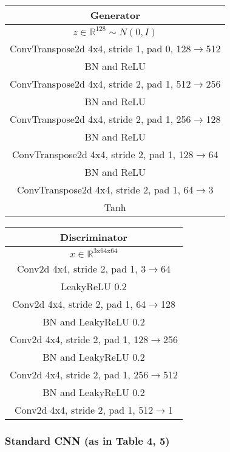 \documentclass{article}
\begin{document}
\begin{center}
\begin{tabular}{c}
	Generator \\
	\toprule\midrule
	$z \in \mathbb{R}^{128} \sim N(0,I)$ \\
	\midrule
	ConvTranspose2d 4x4, stride 1, pad 0, 128$\to$512 \\
	\midrule
	BN and ReLU \\
	\midrule
	ConvTranspose2d 4x4, stride 2, pad 1, 512$\to$256 \\
	\midrule
	BN and ReLU \\
	\midrule
	ConvTranspose2d 4x4, stride 2, pad 1, 256$\to$128 \\
	\midrule
	BN and ReLU \\
	\midrule
	ConvTranspose2d 4x4, stride 2, pad 1, 128$\to$64 \\
	\midrule
	BN and ReLU \\
	\midrule
	ConvTranspose2d 4x4, stride 2, pad 1, 64$\to$3 \\
	\midrule
	Tanh \\
	\bottomrule
\end{tabular} 
\end{center}
\begin{center}
\begin{tabular}{c}
	Discriminator \\
	\toprule\midrule
	$x \in \mathbb{R}^{\text{3x64x64}}$ \\
	\midrule
	Conv2d 4x4, stride 2, pad 1, 3$\to$64 \\
	\midrule
	LeakyReLU 0.2 \\
	\midrule
	Conv2d 4x4, stride 2, pad 1, 64$\to$128 \\
	\midrule
	BN and LeakyReLU 0.2 \\
	\midrule
	Conv2d 4x4, stride 2, pad 1, 128$\to$256 \\
	\midrule
	BN and LeakyReLU 0.2 \\
	\midrule
	Conv2d 4x4, stride 2, pad 1, 256$\to$512 \\
	\midrule
	BN and LeakyReLU 0.2 \\
	\midrule
	Conv2d 4x4, stride 2, pad 1, 512$\to$1 \\
	\bottomrule
\end{tabular}
\end{center}

\subsubsection{Standard CNN (as in Table 4, 5)}
\end{document}
